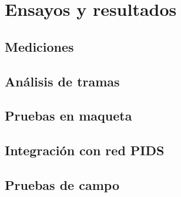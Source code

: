 
\chapter{Ensayos y resultados} %

\label{Chapter4} %


\section{Mediciones}
\pagebreak

\section{Análisis de tramas}

\pagebreak
\section{Pruebas en maqueta}

\pagebreak
\section{Integración con red PIDS}

\pagebreak
\section{Pruebas de campo}